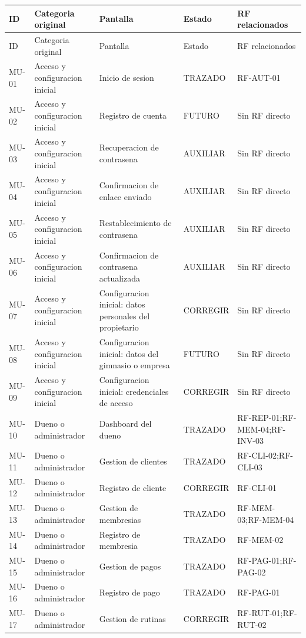 \documentclass[11pt,a4paper,twoside]{article}
\begin{document}
\begin{longtable}{p{1.0cm}p{2.7cm}p{3.0cm}p{3.1cm}p{2.8cm}}
\toprule ID & Categoria original & Pantalla & Estado & RF relacionados \\ \midrule
\endfirsthead
\toprule ID & Categoria original & Pantalla & Estado & RF relacionados \\ \midrule
\endhead
MU-01 & Acceso y configuracion inicial & Inicio de sesion & TRAZADO & RF-AUT-01 \\
MU-02 & Acceso y configuracion inicial & Registro de cuenta & FUTURO & Sin RF directo \\
MU-03 & Acceso y configuracion inicial & Recuperacion de contrasena & AUXILIAR & Sin RF directo \\
MU-04 & Acceso y configuracion inicial & Confirmacion de enlace enviado & AUXILIAR & Sin RF directo \\
MU-05 & Acceso y configuracion inicial & Restablecimiento de contrasena & AUXILIAR & Sin RF directo \\
MU-06 & Acceso y configuracion inicial & Confirmacion de contrasena actualizada & AUXILIAR & Sin RF directo \\
MU-07 & Acceso y configuracion inicial & Configuracion inicial: datos personales del propietario & CORREGIR & Sin RF directo \\
MU-08 & Acceso y configuracion inicial & Configuracion inicial: datos del gimnasio o empresa & FUTURO & Sin RF directo \\
MU-09 & Acceso y configuracion inicial & Configuracion inicial: credenciales de acceso & CORREGIR & Sin RF directo \\
MU-10 & Dueno o administrador & Dashboard del dueno & TRAZADO & RF-REP-01;RF-MEM-04;RF-INV-03 \\
MU-11 & Dueno o administrador & Gestion de clientes & TRAZADO & RF-CLI-02;RF-CLI-03 \\
MU-12 & Dueno o administrador & Registro de cliente & CORREGIR & RF-CLI-01 \\
MU-13 & Dueno o administrador & Gestion de membresias & TRAZADO & RF-MEM-03;RF-MEM-04 \\
MU-14 & Dueno o administrador & Registro de membresia & TRAZADO & RF-MEM-02 \\
MU-15 & Dueno o administrador & Gestion de pagos & TRAZADO & RF-PAG-01;RF-PAG-02 \\
MU-16 & Dueno o administrador & Registro de pago & TRAZADO & RF-PAG-01 \\
MU-17 & Dueno o administrador & Gestion de rutinas & CORREGIR & RF-RUT-01;RF-RUT-02 \\

\end{longtable}
\end{document}

